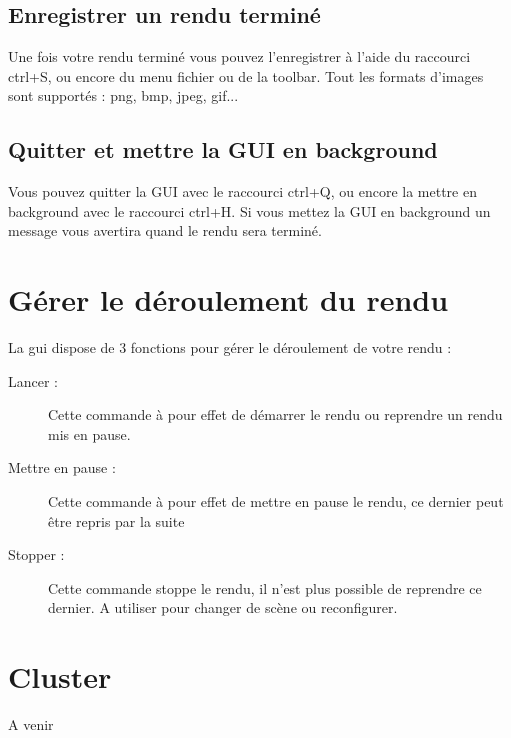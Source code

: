 \documentclass{report}
\begin{document}
\section{Enregistrer un rendu termin\'e}
Une fois votre rendu termin\'e vous pouvez l'enregistrer \`a l'aide du raccourci ctrl+S, ou encore du menu fichier ou de la toolbar.
Tout les formats d'images sont support\'es : png, bmp, jpeg, gif...
\section{Quitter et mettre la GUI en background}
Vous pouvez quitter la GUI avec le raccourci ctrl+Q, ou encore la mettre en background avec le raccourci ctrl+H.
Si vous mettez la GUI en background un message vous avertira quand le rendu sera termin\'e.
\chapter{G\'erer le d\'eroulement du rendu}
La gui dispose de 3 fonctions pour g\'erer le d\'eroulement de votre rendu :
\begin{description}
 \item [Lancer :] Cette commande \`a pour effet de d\'emarrer le rendu ou reprendre un rendu mis en pause.
 \item [Mettre en pause :] Cette commande \`a pour effet de mettre en pause le rendu, ce dernier peut \^etre repris par la suite
 \item [Stopper :] Cette commande stoppe le rendu, il n'est plus possible de reprendre ce dernier. A utiliser pour changer de sc\`ene ou reconfigurer.
\end{description}
\chapter{Cluster}
A venir
\end{document}
